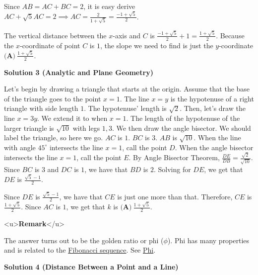 \begin{enumerate}
 Since $AB=AC+BC=2$, it is easy derive $AC+\sqrt{5}AC=2 \implies AC=\frac{2}{1+\sqrt{5}}=\frac{-1+\sqrt{5}}{2}$.

 The vertical distance between the $x$-axis and $C$ is $\frac{-1+\sqrt{5}}{2}+1=\frac{1+\sqrt{5}}{2}$. Because the $x$-coordinate of point $C$ is $1$, the slope we need to find is just the $y$-coordinate $\boxed{\textbf{(A)} \ \frac{1+\sqrt{5}}{2}}.$




\textbf{Solution 3 (Analytic and Plane Geometry)}

Let's begin by drawing a triangle that starts at the origin. Assume that the base of the triangle goes to the point $x = 1$. The line $x = y$ is the hypotenuse of a right triangle with side length $1$. The hypotenuse' length is $\sqrt 2$. Then, let's draw the line $x = 3y$. We extend it to when $x = 1$. The length of the hypotenuse of the larger triangle is $\sqrt {10}$ with legs $1, 3$. We then draw the angle bisector. We should label the triangle, so here we go. $AC$ is $1$. $BC$ is $3$. $AB$ is $\sqrt {10}$. When the line with angle $45 ^\circ$ intersects the line $x = 1$, call the point $D$. When the angle bisector intersects the line $x = 1$, call the point $E$. By Angle Bisector Theorem, $\frac {DE}{DB} = \frac {\sqrt {2}}{\sqrt{10}}$. Since $BC$ is $3$ and $DC$ is $1$, we have that $BD$ is $2$. Solving for $DE$, we get that $DE$ is $\frac {\sqrt 5 - 1}{2}$. 

 Since $DE$ is $\frac {\sqrt 5 - 1}{2}$, we have that $CE$ is just one more than that. Therefore, $CE$ is $\frac {1+\sqrt 5}{2}$. Since $AC$ is $1$, we get that $k$ is $\boxed{\textbf{(A)} \ \frac{1+\sqrt{5}}{2}}$.

 <u>\textbf{Remark}</u>

 The answer turns out to be the golden ratio or phi ($\phi$). Phi has many properties and is related to the \href{https://artofproblemsolving.com/wiki/index.php?title=Fibonacci\_sequence}{Fibonacci sequence}. See \href{https://artofproblemsolving.com/wiki/index.php?title=Phi}{Phi}.

 



\textbf{Solution 4 (Distance Between a Point and a Line)}


\end{enumerate}
